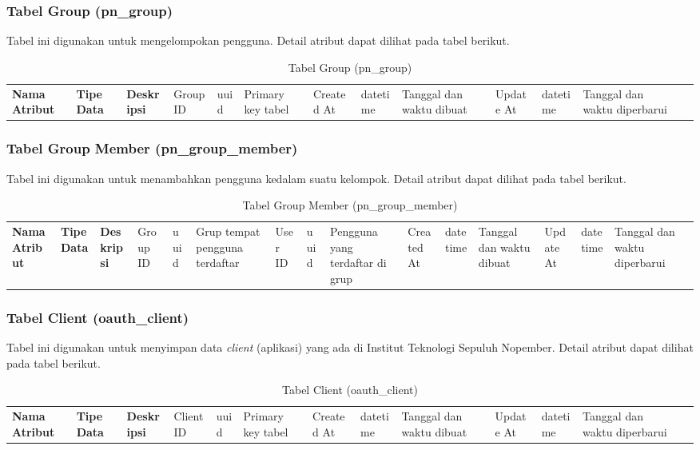 \subsubsection{Tabel Group (pn\_group)}
\par Tabel ini digunakan untuk mengelompokan pengguna. Detail atribut dapat dilihat pada tabel berikut.
\begin{longtable}{|p{2.5cm}|p{2cm}|p{4.5cm}|}
    \hline
    \textbf{Nama Atribut} & \textbf{Tipe Data} & \textbf{Deskripsi} & \hline
    Group ID & uuid & Primary key tabel & \hline
    Created At & datetime & Tanggal dan waktu dibuat & \hline
    Update At & datetime & Tanggal dan waktu diperbarui & \hline
    \caption{Tabel Group (pn\_group)}
\end{longtable}

\subsubsection{Tabel Group Member (pn\_group\_member)}
\par Tabel ini digunakan untuk menambahkan pengguna kedalam suatu kelompok. Detail atribut dapat dilihat pada tabel berikut.
\begin{longtable}{|p{2.5cm}|p{2cm}|p{4.5cm}|}
    \hline
    \textbf{Nama Atribut} & \textbf{Tipe Data} & \textbf{Deskripsi} & \hline
    Group ID & uuid & Grup tempat pengguna terdaftar & \hline
    User ID & uuid & Pengguna yang terdaftar di grup & \hline
    Created At & datetime & Tanggal dan waktu dibuat & \hline
    Update At & datetime & Tanggal dan waktu diperbarui & \hline
    \caption{Tabel Group Member (pn\_group\_member)}
\end{longtable}

\subsubsection{Tabel Client (oauth\_client)}
\par Tabel ini digunakan untuk menyimpan data \textit{client} (aplikasi) yang ada di Institut Teknologi Sepuluh Nopember. Detail atribut dapat dilihat pada tabel berikut.
\begin{longtable}{|p{2.5cm}|p{2cm}|p{4.5cm}|}
    \hline
    \textbf{Nama Atribut} & \textbf{Tipe Data} & \textbf{Deskripsi} & \hline
    Client ID & uuid & Primary key tabel & \hline
    Created At & datetime & Tanggal dan waktu dibuat & \hline
    Update At & datetime & Tanggal dan waktu diperbarui & \hline
    \caption{Tabel Client (oauth\_client)}
\end{longtable}

